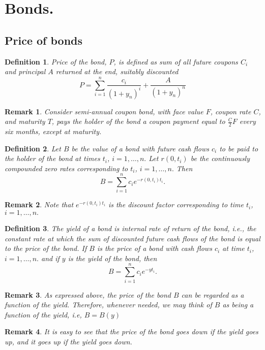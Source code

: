 \documentclass{book}
\newtheorem{definition}{Definition}[section]
\newtheorem{remark}{Remark}[section]
\begin{document}
\section{Bonds.}
\subsection{Price of bonds}
\begin{definition}
Price of the bond, $P$, is defined as sum of all future coupons $C_{i}$ and principal $A$ returned at the end, suitably discounted
$$
P=\sum_{i=1}^{n}\frac{c_{i}}{(1+y_{n})^{i}}+\frac{A}{(1+y_{n})^{n}}
$$ 
\end{definition}
\begin{remark}
Consider semi-annual coupon bond, with face value $F$, coupon rate $C$, and maturity $T$, pays the holder of the bond a coupon payment equal to $\frac{C}{2}F$ every six months, except at maturity.
\end{remark}
\begin{definition}
Let $B$ be the value of a bond with future cash flows $c_{i}$ to be paid to the holder of the bond at times $t_{i}$, $i=1,\dots,n.$ Let $r(0,t_{i})$ be the continuously compounded zero rates corresponding to $t_{i}$, $i=1,\dots,n.$ Then
$$
B=\sum_{i=1}^{n}c_{i}e^{-r(0,t_{i})t_{i}}.
$$	
\end{definition}
\begin{remark}
Note that $e^{-r(0,t_{i})t_{i}}$ is the discount factor corresponding to time $t_{i}$, $i=1,\dots,n.$
\end{remark}
\begin{definition}
The yield of a bond is internal rate of return of the bond, i.e., the constant rate at which the sum of discounted future cash flows of the bond is equal to the price of the bond. If $B$ is the price of a bond with cash flows $c_{i}$ at time $t_{i}$, $i=1,\dots,n.$ and if $y$ is the yield of the bond, then 
\begin{equation}
\label{melon}
B=\sum_{i=1}^{n}c_{i}e^{-y t_{i}}.
\end{equation}
\end{definition}
\begin{remark}
As expressed above, the price of the bond $B$ can be regarded as a function of the yield. Therefore, whenever needed, we may think of $B$ as being a function of the yield, i.e, $B=B(y)$
\end{remark}
\begin{remark}
It is easy to see that the price of the bond goes down if the yield goes up, and it goes up if the yield goes down.
\end{remark}
\end{document}
